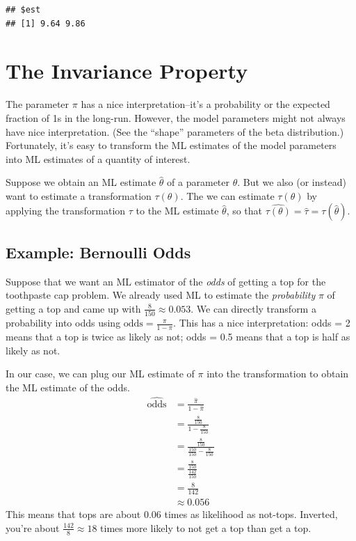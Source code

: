 \documentclass[
]{book}
\begin{document}
\begin{verbatim}
## $est
## [1] 9.64 9.86
\end{verbatim}

\hypertarget{the-invariance-property}{%
\section{The Invariance Property}\label{the-invariance-property}}

The parameter \(\pi\) has a nice interpretation--it's a probability or
the expected fraction of 1s in the long-run. However, the model
parameters might not always have nice interpretation. (See the ``shape''
parameters of the beta distribution.) Fortunately, it's easy to
transform the ML estimates of the model parameters into ML estimates of
a quantity of interest.

Suppose we obtain an ML estimate \(\hat{\theta}\) of a parameter
\(\theta\). But we also (or instead) want to estimate a transformation
\(\tau(\theta)\). The we can estimate \(\tau(\theta)\) by applying the
transformation \(\tau\) to the ML estimate \(\hat{\theta}\), so that
\(\widehat{\tau(\theta)} = \hat{\tau} = \tau(\hat{\theta})\).

\hypertarget{example-bernoulli-odds}{%
\subsection{Example: Bernoulli Odds}\label{example-bernoulli-odds}}

Suppose that we want an ML estimator of the \emph{odds} of getting a top
for the toothpaste cap problem. We already used ML to estimate the
\emph{probability} \(\pi\) of getting a top and came up with
\(\frac{8}{150} \approx 0.053\). We can directly transform a probability
into odds using \(\text{odds} = \frac{\pi}{1 - \pi}\). This has a nice
interpretation: odds = 2 means that a top is twice as likely as not;
odds = 0.5 means that a top is half as likely as not.

In our case, we can plug our ML estimate of \(\pi\) into the
transformation to obtain the ML estimate of the odds. \[
\begin{aligned}
\widehat{\text{odds}} &= \frac{\hat{\pi}}{1 - \hat{\pi}} \\
& = \frac{\frac{8}{150}}{1 - \frac{8}{150}} \\
& = \frac{\frac{8}{150}}{\frac{150}{150} - \frac{8}{150}} \\
& = \frac{\frac{8}{150}}{\frac{142}{150}} \\
& = \frac{8}{142} \\
& \approx 0.056
\end{aligned}
\] This means that tops are about 0.06 times as likelihood as not-tops.
Inverted, you're about \(\frac{142}{8} \approx 18\) times more likely to
not get a top than get a top.
\end{document}
